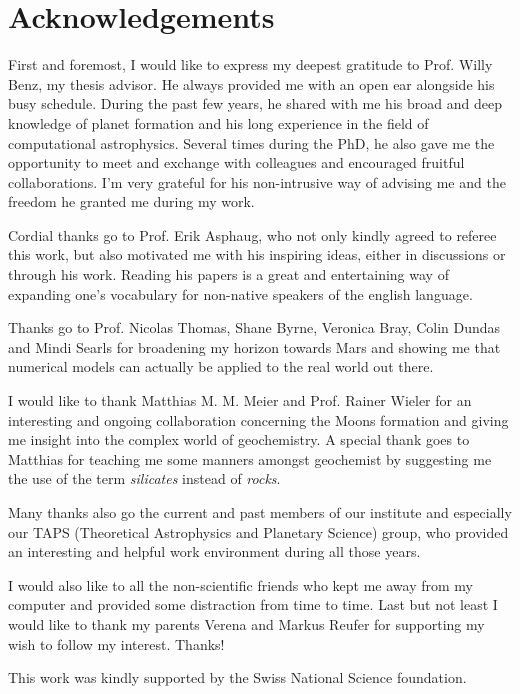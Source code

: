 \cleardoublepage
\chapter*{Acknowledgements}

First and foremost, I would like to express my deepest gratitude to Prof. Willy Benz, my thesis advisor. He always provided me with an open ear alongside his busy schedule. During the past few years, he shared with me his broad and deep knowledge of planet formation and his long experience in the field of computational astrophysics. Several times during the PhD, he also gave me the opportunity to meet and exchange with colleagues and encouraged fruitful collaborations. I'm very grateful for his non-intrusive way of advising me and the freedom he granted me during my work.

Cordial thanks go to Prof. Erik Asphaug, who not only kindly agreed to referee this work, but also motivated me with his inspiring ideas, either in discussions or through his work. Reading his papers is a great and entertaining way of expanding one's vocabulary for non-native speakers of the english language.

Thanks go to Prof. Nicolas Thomas, Shane Byrne, Veronica Bray, Colin Dundas and Mindi Searls for broadening my horizon towards Mars and showing me that numerical models can actually be applied to the real world out there.

I would like to thank Matthias M. M. Meier and Prof. Rainer Wieler for an interesting and ongoing collaboration concerning the Moons formation and giving me insight into the complex world of geochemistry. A special thank goes to Matthias for teaching me some manners amongst geochemist by suggesting me the use of the term \emph{silicates} instead of \emph{rocks}.

Many thanks also go the current and past members of our institute and especially our TAPS (Theoretical Astrophysics and Planetary Science) group, who provided an interesting and helpful work environment during all those years.

I would also like to all the non-scientific friends who kept me away from my computer and provided some distraction from time to time. Last but not least I would like to thank my parents Verena and Markus Reufer for supporting my wish to follow my interest. Thanks!

This work was kindly supported by the Swiss National Science foundation.
